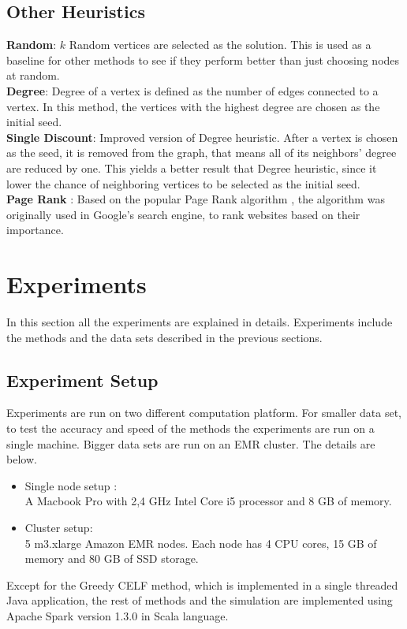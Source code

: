 \documentclass[english]{tktltiki}
\begin{document}
\subsection{Other Heuristics}
\textbf{Random}: $k$ Random vertices are selected as the solution. This is used as a baseline for other methods to see if they perform better than just choosing nodes at random. \\
\textbf{Degree}: Degree of a vertex is defined as the number of edges connected to a vertex. In this method, the vertices with the highest degree are chosen as the initial seed. \\ 
\textbf{Single Discount}: Improved version of Degree heuristic. After a vertex is chosen as the seed, it is removed from the graph, that means all of its neighbors' degree are reduced by one. This yields a better result that Degree heuristic, since it lower the chance of neighboring vertices to be selected as the initial seed. \\ 
\textbf {Page Rank} : Based on the popular Page Rank algorithm \cite{page99}, the algorithm was originally used in Google's search engine, to rank websites based on their importance. 

\newpage


\section{Experiments}
\label{sec:experiments}
In this section all the experiments are explained in details. Experiments include the methods and the data sets described in the previous sections. 
\subsection{Experiment Setup}
Experiments are run on two different computation platform. For smaller data set, to test the accuracy and speed of the methods the experiments are run on a single machine. Bigger data sets are run on an EMR cluster. The details are below. 

\begin{itemize}
\item Single node setup : \\
A Macbook Pro with 2,4 GHz Intel Core i5 processor and 8 GB of memory. 
\item Cluster setup: \\
5 m3.xlarge Amazon EMR nodes. Each node has 4 CPU cores, 15 GB of memory and 80 GB of SSD storage.
\end{itemize}
Except for the Greedy CELF method, which is implemented in a single threaded Java application, the rest of methods and the simulation are implemented using Apache Spark version 1.3.0 in Scala language. 
\end{document}
